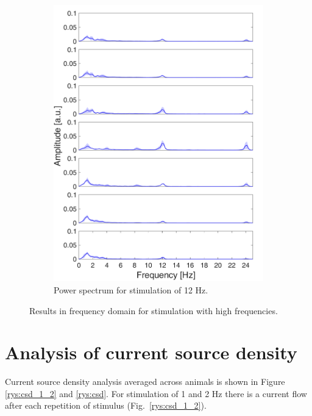 \documentclass{pracalicmgr}
\begin{document}
\begin{figure}[H]
\begin{subfigure}{.5\textwidth}
		\includegraphics[width=1.\linewidth]{widmo_12Hz.png}
		\caption{Power spectrum for stimulation of 12 Hz.}
		\label{rys:widmo_12Hz}
	\end{subfigure}
	
	\caption{Results in frequency domain for stimulation with high frequencies.}
	\label{rys:srednie_widmo}
	
\end{figure}    
\section{Analysis of current source density}
\label{sec:csd}


Current source density analysis averaged across animals is shown in Figure \ref{rys:csd_1_2} and \ref{rys:csd}. For stimulation of 1 and 2 Hz there 
is a current flow after each repetition of stimulus (Fig.~\ref{rys:csd_1_2}). 
\end{document}
